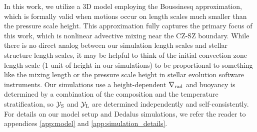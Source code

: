 In this work, we utilize a 3D model employing the Boussinesq approximation, which is formally valid when motions occur on length scales much smaller than the pressure scale height.
This approximation fully captures the primary focus of this work, which is nonlinear advective mixing near the CZ-SZ boundary.
While there is no direct analog between our simulation length scales and stellar structure length scales, it may be helpful to think of the initial convection zone length scale (1 unit of height in our simulations) to be proportional to something like the mixing length or the pressure scale height in stellar evolution software instruments.
Our simulations use a height-dependent $\nabla_{\rm{rad}}$ and buoyancy is determined by a combination of the composition and the temperature stratification, so $\mathcal{Y}_{\rm{S}}$ and $\mathcal{Y}_{\rm{L}}$ are determined independently and self-consistently.
For details on our model setup and Dedalus simulations, we refer the reader to appendices \ref{app:model} and \ref{app:simulation_details}.
